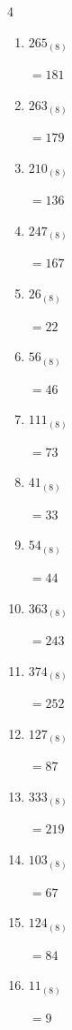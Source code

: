 \begin{multicols}{4}
\begin{enumerate}
        $=207$

  \item $265_{(8)}$

        $=181$

  \item $263_{(8)}$

        $=179$

  \item $210_{(8)}$

        $=136$

\columnbreak %

  \item $247_{(8)}$

        $=167$

  \item $26_{(8)}$

        $=22$

  \item $56_{(8)}$

        $=46$

  \item $111_{(8)}$

        $=73$

  \item $41_{(8)}$

        $=33$

  \item $54_{(8)}$

        $=44$

  \item $363_{(8)}$

        $=243$

  \item $374_{(8)}$

        $=252$

  \item $127_{(8)}$

        $=87$

  \item $333_{(8)}$

        $=219$

  \item $103_{(8)}$

        $=67$

  \item $124_{(8)}$

        $=84$

  \item $11_{(8)}$

        $=9$


\end{enumerate}
\end{multicols}
